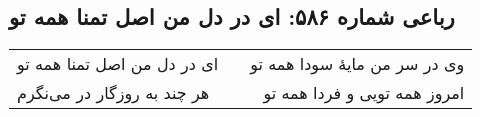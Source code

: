 \begin{center}
\section*{رباعی شماره ۵۸۶: ای در دل من اصل تمنا همه تو}
\label{sec:sh586}
\begin{longtable}{l p{0.5cm} r}
ای در دل من اصل تمنا همه تو
&&
وی در سر من مایهٔ سودا همه تو
\\
هر چند به روزگار در می‌نگرم
&&
امروز همه تویی و فردا همه تو
\\
\end{longtable}
\end{center}
